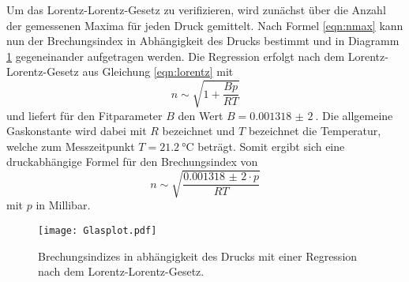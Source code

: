 

Um das Lorentz-Lorentz-Gesetz zu verifizieren, wird zunächst über die Anzahl der gemessenen Maxima für jeden
Druck gemittelt. Nach Formel \ref{eqn:nmax} kann nun der Brechungsindex in Abhängigkeit des Drucks bestimmt
und in Diagramm \ref{fig:Lorentz} gegeneinander aufgetragen werden.
Die Regression erfolgt nach dem Lorentz-Lorentz-Gesetz aus Gleichung \ref{eqn:lorentz} mit
\begin{equation}
  n\sim\sqrt{1+\frac{Bp}{RT}}
\end{equation}
und liefert für den Fitparameter $B$ den Wert $B=\SI{0,001318(2)}{}$. Die allgemeine Gaskonstante wird dabei mit $R$
bezeichnet und $T$ bezeichnet die Temperatur, welche zum Messzeitpunkt $T=\SI{21,2}{\celsius}$ beträgt.
Somit ergibt sich eine druckabhängige Formel für den Brechungsindex von
\begin{equation}
  n\sim\sqrt{\frac{\SI{0,001318(2)}\cdot p}{RT}}
\end{equation}
mit $p$ in Millibar.

\begin{figure}[H]
  \centering
  \texttt{[image: Glasplot.pdf]}
  \caption{Brechungsindizes in abhängigkeit des Drucks mit einer Regression nach dem Lorentz-Lorentz-Gesetz.}
  \label{fig:Lorentz}
\end{figure}



